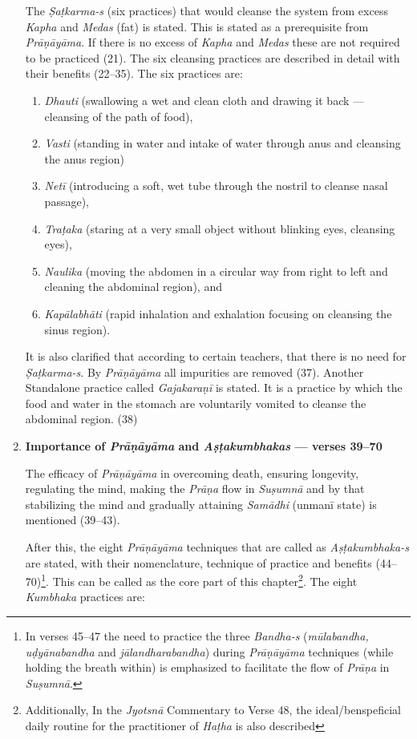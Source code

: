 \begin{enumerate}
The \textit{Ṣaṭkarma-s} (six practices)  that would cleanse the system from excess \textit{Kapha} and \textit{Medas} (fat) is stated. This is stated as a prerequisite from \textit{Prāṇāyāma}. If there is no excess of \textit{Kapha} and \textit{Medas} these are not required to be practiced (21). The six cleansing practices are described in detail with their benefits (22--35). The six practices are:
\begin{enumerate}
\item \textit{Dhauti} (swallowing a wet and clean cloth and drawing it back --- cleansing of the path of food), 
\item \textit{Vasti} (standing in water and intake of water through anus and cleansing the anus region)          
\item \textit{Netī} (introducing a soft, wet tube through the nostril to cleanse nasal passage),                                  
\item \textit{Traṭaka} (staring at a very small object without blinking eyes, cleansing eyes),                            
\item \textit{Naulika} (moving the abdomen in a circular way from right to left and cleaning the abdominal region), and
\item \textit{Kapālabhāti} (rapid inhalation and exhalation focusing on cleansing the sinus region).
\end{enumerate}

It is also clarified that according to certain teachers, that there is no need for \textit{Ṣaṭkarma-s}. By \textit{Prāṇāyāma} all impurities are removed (37). Another Standalone practice called \textit{Gajakaraṇī} is stated. It is a practice by which the food and water in the stomach are voluntarily vomited to cleanse the abdominal region. (38) 

\item \textbf{Importance of \textit{Prāṇāyāma} and \textit{Aṣṭakumbhakas} --- verses 39--70}

The efficacy of \textit{Prāṇāyāma} in overcoming death, ensuring longevity, regulating the mind, making the \textit{Prāṇa} flow in \textit{Suṣumnā} and by that stabilizing the mind and gradually attaining \textit{Samādhi} (unmanī state) is mentioned (39--43).

After this, the eight \textit{Prāṇāyāma} techniques that are called as \textit{Aṣṭakumbhaka-s} are stated, with their nomenclature, technique of practice and benefits (44--70)\footnote{In verses 45--47 the need to practice the three \textit{Bandha-s} (\textit{mūlabandha, uḍyānabandha} and \textit{jālandharabandha}) during \textit{Prāṇāyāma} techniques  (while holding the breath within) is emphasized to facilitate the flow of \textit{Prāṇa} in \textit{Suṣumnā}.}. This can be called as the core part of this chapter\footnote{Additionally, In the \textit{Jyotsnā} Commentary to Verse 48, the ideal/benspeficial daily routine for the practitioner of \textit{Haṭha} is also described}. The eight \textit{Kumbhaka} practices are:


\end{enumerate}
